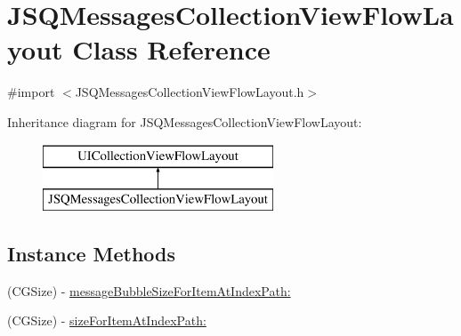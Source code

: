\hypertarget{interface_j_s_q_messages_collection_view_flow_layout}{}\section{J\+S\+Q\+Messages\+Collection\+View\+Flow\+Layout Class Reference}
\label{interface_j_s_q_messages_collection_view_flow_layout}


{\ttfamily \#import $<$J\+S\+Q\+Messages\+Collection\+View\+Flow\+Layout.\+h$>$}

Inheritance diagram for J\+S\+Q\+Messages\+Collection\+View\+Flow\+Layout\+:\begin{figure}[H]
\begin{center}
\leavevmode
\includegraphics[height=2.000000cm]{interface_j_s_q_messages_collection_view_flow_layout}
\end{center}
\end{figure}
\subsection*{Instance Methods}
\begin{DoxyCompactItemize}
\item 
(C\+G\+Size) -\/ \hyperlink{interface_j_s_q_messages_collection_view_flow_layout_aecccb28434357c9f960906ec3e552d60}{message\+Bubble\+Size\+For\+Item\+At\+Index\+Path\+:}
\item 
(C\+G\+Size) -\/ \hyperlink{interface_j_s_q_messages_collection_view_flow_layout_af665f3e63d5d22ed0b9f14ac51850967}{size\+For\+Item\+At\+Index\+Path\+:}
\end{DoxyCompactItemize}
